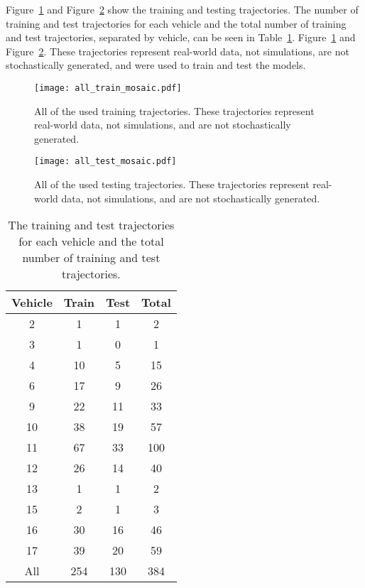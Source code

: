 \documentclass[preprint,12pt]{elsarticle}
\begin{document}
Figure~\ref{fig:all_train_mosaic} and Figure~\ref{fig:all_test_mosaic} show the training and testing trajectories. The number of training and test trajectories for each vehicle and the total number of training and test trajectories, separated by vehicle, can be seen in Table~\ref{tab:testtrain}. Figure~\ref{fig:all_train_mosaic} and Figure~\ref{fig:all_test_mosaic}. These trajectories represent real-world data, not simulations, are not stochastically generated, and were used to train and test the models.

\begin{figure}[!ht]
    \centering
    \texttt{[image: all\_train\_mosaic.pdf]}
    \caption{All of the used training trajectories. These trajectories represent real-world data, not simulations, and are not stochastically generated.}
    \label{fig:all_train_mosaic}
\end{figure}

\begin{figure}[!ht]
    \centering
    \texttt{[image: all\_test\_mosaic.pdf]}
    \caption{All of the used testing trajectories. These trajectories represent real-world data, not simulations, and are not stochastically generated.}
    \label{fig:all_test_mosaic}
\end{figure}
 
\begin{table}[!ht]
    \centering
    \begin{tabular}{|c|c|c|c|}
       \hline
        Vehicle & Train & Test & Total \\ \hline
        2 & 1 & 1 & 2 \\ \hline
        3 & 1 & 0 & 1 \\ \hline
        4 & 10 & 5 & 15 \\ \hline
        6 & 17 & 9 & 26 \\ \hline
        9 & 22 & 11 & 33 \\ \hline
        10 & 38 & 19 & 57 \\ \hline
        11 & 67 & 33 & 100 \\ \hline
        12 & 26 & 14 & 40 \\ \hline
        13 & 1 & 1 & 2 \\ \hline
        15 & 2 & 1 & 3 \\ \hline
        16 & 30 & 16 & 46 \\ \hline
        17 & 39 & 20 & 59 \\ \hline
        All & 254 & 130 & 384 \\ \hline
    \end{tabular}
    \caption{The training and test trajectories for each vehicle and the total number of training and test trajectories.}
    \label{tab:testtrain}
\end{table}
\end{document}

